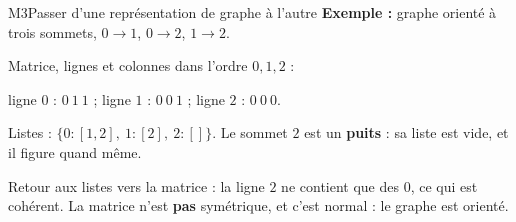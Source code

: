 \begin{fichemethode}{M3}{Passer d'une représentation de graphe à l'autre}
\textbf{Exemple :} graphe orienté à trois sommets, $0 \to 1$, $0 \to 2$, $1 \to 2$.

Matrice, lignes et colonnes dans l'ordre $0, 1, 2$ :

ligne $0$ : $0\ 1\ 1$ ; ligne $1$ : $0\ 0\ 1$ ; ligne $2$ : $0\ 0\ 0$.

Listes : $\{0: [1, 2],\ 1: [2],\ 2: []\}$. Le sommet $2$ est un \textbf{puits} : sa liste est
vide, et il figure quand même.

Retour aux listes vers la matrice : la ligne $2$ ne contient que des $0$, ce qui est
cohérent. La matrice n'est \textbf{pas} symétrique, et c'est normal : le graphe est orienté.

%
%
%
%
%
%
%


\end{fichemethode}
